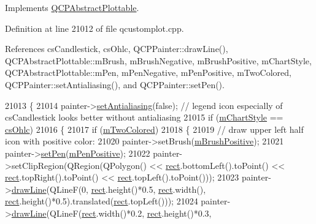 Implements \hyperlink{class_q_c_p_abstract_plottable_a9a450783fd9ed539e589999fd390cdf7}{Q\+C\+P\+Abstract\+Plottable}.



Definition at line 21012 of file qcustomplot.\+cpp.



References cs\+Candlestick, cs\+Ohlc, Q\+C\+P\+Painter\+::draw\+Line(), Q\+C\+P\+Abstract\+Plottable\+::m\+Brush, m\+Brush\+Negative, m\+Brush\+Positive, m\+Chart\+Style, Q\+C\+P\+Abstract\+Plottable\+::m\+Pen, m\+Pen\+Negative, m\+Pen\+Positive, m\+Two\+Colored, Q\+C\+P\+Painter\+::set\+Antialiasing(), and Q\+C\+P\+Painter\+::set\+Pen().


\begin{DoxyCode}
21013 \{
21014   painter->\hyperlink{class_q_c_p_painter_aaba1deb9188244d9ea65b035112b4d05}{setAntialiasing}(\textcolor{keyword}{false}); \textcolor{comment}{// legend icon especially of csCandlestick looks better
       without antialiasing}
21015   \textcolor{keywordflow}{if} (\hyperlink{class_q_c_p_financial_ab65c2ce8d6354451870bb44b894c1e92}{mChartStyle} == \hyperlink{class_q_c_p_financial_a0f800e21ee98d646dfc6f8f89d10ebfba3a516016c9298d3e95dd82aa203c4390}{csOhlc})
21016   \{
21017     \textcolor{keywordflow}{if} (\hyperlink{class_q_c_p_financial_a6afe919190b884d9bac026cefcc8c0a8}{mTwoColored})
21018     \{
21019       \textcolor{comment}{// draw upper left half icon with positive color:}
21020       painter->setBrush(\hyperlink{class_q_c_p_financial_ab7e6eed16260a2f88ca6bd940dffea79}{mBrushPositive});
21021       painter->\hyperlink{class_q_c_p_painter_af9c7a4cd1791403901f8c5b82a150195}{setPen}(\hyperlink{class_q_c_p_financial_aa6599186f417ba615caebb3f6c762bd8}{mPenPositive});
21022       painter->setClipRegion(QRegion(QPolygon() << \hyperlink{_gen_blob_8m_aea8f6815d9a63491fc422c5572c6b3c3}{rect}.bottomLeft().toPoint() << 
      \hyperlink{_gen_blob_8m_aea8f6815d9a63491fc422c5572c6b3c3}{rect}.topRight().toPoint() << \hyperlink{_gen_blob_8m_aea8f6815d9a63491fc422c5572c6b3c3}{rect}.topLeft().toPoint()));
21023       painter->\hyperlink{class_q_c_p_painter_a0b4b1b9bd495e182c731774dc800e6e0}{drawLine}(QLineF(0, \hyperlink{_gen_blob_8m_aea8f6815d9a63491fc422c5572c6b3c3}{rect}.height()*0.5, \hyperlink{_gen_blob_8m_aea8f6815d9a63491fc422c5572c6b3c3}{rect}.width(), 
      \hyperlink{_gen_blob_8m_aea8f6815d9a63491fc422c5572c6b3c3}{rect}.height()*0.5).translated(\hyperlink{_gen_blob_8m_aea8f6815d9a63491fc422c5572c6b3c3}{rect}.topLeft()));
21024       painter->\hyperlink{class_q_c_p_painter_a0b4b1b9bd495e182c731774dc800e6e0}{drawLine}(QLineF(\hyperlink{_gen_blob_8m_aea8f6815d9a63491fc422c5572c6b3c3}{rect}.width()*0.2, \hyperlink{_gen_blob_8m_aea8f6815d9a63491fc422c5572c6b3c3}{rect}.height()*0.3, 

\end{DoxyCode}
